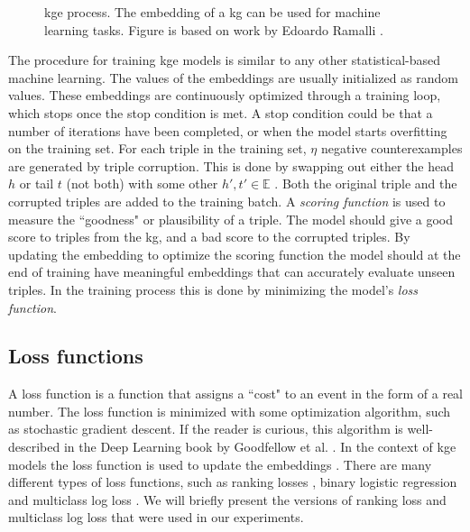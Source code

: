 \begin{figure}[htp]
    \centering
    
    \caption[KGE process.]{\gls{kge} process. The embedding of a \gls{kg} can be used for machine learning tasks. Figure is based on work by Edoardo Ramalli \cite{wiki_KG_embedding}.}
    \label{KG_embdding_diag}
\end{figure}

The procedure for training \gls{kge} models is similar to any other statistical-based machine learning. The values of the embeddings are usually initialized as random values. These embeddings are continuously optimized through a training loop, which stops once the stop condition is met. A stop condition could be that a number of iterations have been completed, or when the model starts overfitting on the training set. For each triple in the training set, $\eta$ negative counterexamples are generated by triple corruption. This is done by swapping out either the head $h$ or tail $t$ (not both) with some other $h', t' \in \mathbb{E}$ \cite{TransE}. Both the original triple and the corrupted triples are added to the training batch. A \textit{scoring function} is used to measure the ``goodness" or plausibility of a triple. The model should give a good score to triples from the \gls{kg}, and a bad score to the corrupted triples. By updating the embedding to optimize the scoring function the model should at the end of training have meaningful embeddings that can accurately evaluate unseen triples. In the training process this is done by minimizing the model's \textit{loss function}.

\subsection{Loss functions}
A loss function is a function that assigns a ``cost" to an event in the form of a real number. The loss function is minimized with some optimization algorithm, such as stochastic gradient descent. If the reader is curious, this algorithm is well-described in the Deep Learning book by Goodfellow et al. \cite[p. 149]{goodfellow}. In the context of \gls{kge} models the loss function is used to update the embeddings \cite{dai2020survey}. There are many different types of loss functions, such as ranking losses \cite{TransE}, binary logistic regression \cite{complEx} and multiclass log loss \cite{kadlec2017knowledge}. We will briefly present the versions of ranking loss and multiclass log loss that were used in our experiments.

